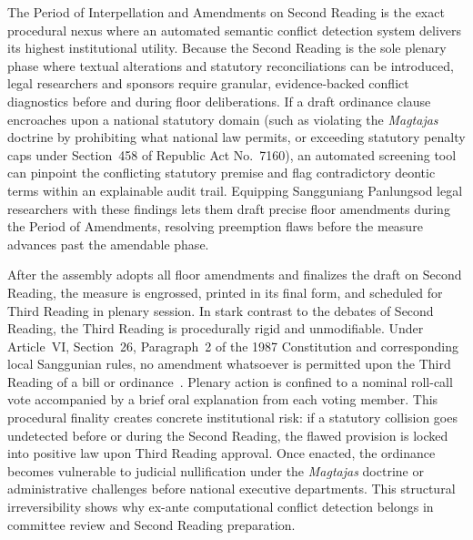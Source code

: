     The Period of Interpellation and Amendments on Second Reading is the exact procedural nexus where an automated semantic conflict detection system delivers its highest institutional utility. Because the Second Reading is the sole plenary phase where textual alterations and statutory reconciliations can be introduced, legal researchers and sponsors require granular, evidence-backed conflict diagnostics before and during floor deliberations. If a draft ordinance clause encroaches upon a national statutory domain (such as violating the \textit{Magtajas} doctrine by prohibiting what national law permits, or exceeding statutory penalty caps under Section~458 of Republic Act No.~7160), an automated screening tool can pinpoint the conflicting statutory premise and flag contradictory deontic terms within an explainable audit trail. Equipping Sangguniang Panlungsod legal researchers with these findings lets them draft precise floor amendments during the Period of Amendments, resolving preemption flaws before the measure advances past the amendable phase.

    After the assembly adopts all floor amendments and finalizes the draft on Second Reading, the measure is engrossed, printed in its final form, and scheduled for Third Reading in plenary session. In stark contrast to the debates of Second Reading, the Third Reading is procedurally rigid and unmodifiable. Under Article~VI, Section~26, Paragraph~2 of the 1987 Constitution and corresponding local Sanggunian rules, no amendment whatsoever is permitted upon the Third Reading of a bill or ordinance~\cite{philconst1987, philhouse2022rules, spdc2022ra00122}. Plenary action is confined to a nominal roll-call vote accompanied by a brief oral explanation from each voting member. This procedural finality creates concrete institutional risk: if a statutory collision goes undetected before or during the Second Reading, the flawed provision is locked into positive law upon Third Reading approval. Once enacted, the ordinance becomes vulnerable to judicial nullification under the \textit{Magtajas} doctrine or administrative challenges before national executive departments. This structural irreversibility shows why ex-ante computational conflict detection belongs in committee review and Second Reading preparation.

